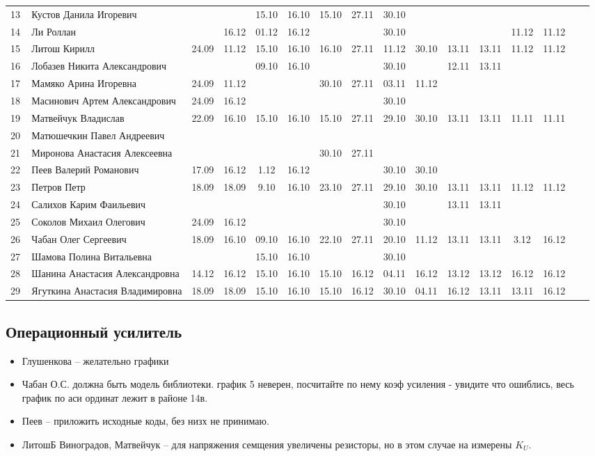 \begin{tabular}{l|llccccccccccccc}
13\,& Кустов Данила Игоревич          &     &     &15.10&16.10 &15.10&27.11 &30.10&\\
14\,& Ли Роллан                       &     &16.12&01.12& 16.12&     &      &30.10&&&& 11.12&11.12\\
15\,& Литош Кирилл                    &24.09&11.12&15.10&16.10 &16.10&27.11 &11.12&30.10&13.11&13.11&11.12&11.12\\
\midrule
16\,& Лобазев Никита Александрович    &     &     &09.10&16.10 &     &      &30.10&     &12.11&13.11\\
17\,& Мамяко Арина Игоревна           &24.09&11.12&     &      &30.10&27.11 &03.11&11.12\\
18\,& Масинович Артем Александрович   &24.09&16.12&     &      &     &      &30.10&\\
19\,& Матвейчук Владислав             &22.09&16.10&15.10&16.10 &15.10&27.11 &29.10&30.10&13.11&13.11&11.11&11.11\\
20\,& Матюшечкин Павел Андреевич      \\
\midrule
21\,& Миронова Анастасия Алексеевна   &     &     &     &      &30.10&27.11&\\
22\,& Пеев Валерий Романович          &17.09&16.12&1.12 &16.12 &     &      &30.10&30.10\\
23\,& Петров Петр                     &18.09&18.09& 9.10&16.10 &23.10&27.11 &29.10&30.10&13.11&13.11&11.12&11.12\\
24\,& Салихов Карим Фаильевич         &     &     &     &      &     &      &30.10&     &13.11&13.11\\
25\,& Соколов Михаил Олегович         &24.09&16.12&     &      &     &      &30.10&\\
\midrule
26\,& Чабан Олег Сергеевич            &18.09&16.10&09.10&16.10&22.10 &27.11 &20.10&11.12&13.11&13.11&3.12&16.12\\
27\,& Шамова Полина Витальевна        &    &      &15.10&16.10 &     &      &30.10&\\
28\,& Шанина Анастасия Александровна  &14.12&16.12&15.10&16.10 &15.10 & 16.12&04.11&16.12&13.12&13.12&16.12&16.12\\
29\,& Ягуткина Анастасия Владимировна &18.09&18.09&15.10&16.10 &15.10 & 16.12&30.10&04.11&16.12&13.11&13.11&16.12\\
\bottomrule
\end{tabular}


\subsection*{Операционный усилитель}
\begin{itemize}
\item Глушенкова -- желательно графики
\item Чабан О.С. должна быть модель библиотеки. график 5 неверен, посчитайте по нему коэф усиления - увидите что ошиблись, весь график по аси ординат лежит в районе 14в.
\item Пеев  -- приложить исходные коды, без низх не принимаю.
\item ЛитошБ Виноградов, Матвейчук -- для напряжения семщения увеличены резисторы, но в этом случае на измерены $K_U$.
\end{itemize}

